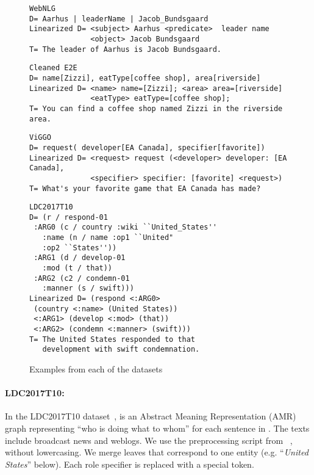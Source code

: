 \documentclass[11pt]{article}
\newcommand{\ldc}{LDC2017T10\xspace}
\theoremstyle{definition}
\theoremstyle{break}
\begin{document}
\begin{figure}[b]
\begin{minipage}[c]{0.63\textwidth}
\begin{lstlisting}
WebNLG
D= Aarhus | leaderName | Jacob_Bundsgaard
Linearized D= <subject> Aarhus <predicate>  leader name 
              <object> Jacob Bundsgaard
T= The leader of Aarhus is Jacob Bundsgaard.
\end{lstlisting} 
\begin{lstlisting}
Cleaned E2E
D= name[Zizzi], eatType[coffee shop], area[riverside]
Linearized D= <name> name=[Zizzi]; <area> area=[riverside]
              <eatType> eatType=[coffee shop]; 
T= You can find a coffee shop named Zizzi in the riverside area.
\end{lstlisting}
\begin{lstlisting}
ViGGO
D= request( developer[EA Canada], specifier[favorite])
Linearized D= <request> request (<developer> developer: [EA Canada], 
              <specifier> specifier: [favorite] <request>)
T= What's your favorite game that EA Canada has made?
\end{lstlisting}
\end{minipage}
\begin{minipage}[c]{0.37\textwidth}
\begin{lstlisting}
LDC2017T10
D= (r / respond-01
 :ARG0 (c / country :wiki ``United_States'' 
   :name (n / name :op1 ``United" 
   :op2 ``States''))
 :ARG1 (d / develop-01
   :mod (t / that))
 :ARG2 (c2 / condemn-01
   :manner (s / swift)))
Linearized D= (respond <:ARG0> 
 (country <:name> (United States)) 
 <:ARG1> (develop <:mod> (that)) 
 <:ARG2> (condemn <:manner> (swift)))
T= The United States responded to that 
   development with swift condemnation.
\end{lstlisting}
\end{minipage}
\caption{Examples from each of the datasets}
\label{fig:dataset_examples}
\end{figure}

\paragraph{\ldc:}
In the \ldc dataset~\cite{knight2017abstract},  is an Abstract Meaning Representation (AMR) graph representing ``who is doing what to whom'' for each sentence in .  The texts include broadcast news and weblogs. We use the preprocessing script from ~, without lowercasing. We merge leaves that correspond to one entity (e.g. ``\textit{United States}'' below). Each role specifier is replaced with a special token.
\end{document}
